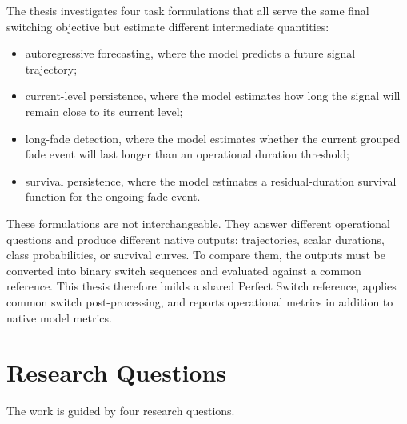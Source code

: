 The thesis investigates four task formulations that all serve the same final
switching objective but estimate different intermediate quantities:

\begin{itemize}
  \item autoregressive forecasting, where the model predicts a future signal
  trajectory;
  \item current-level persistence, where the model estimates how long the
  signal will remain close to its current level;
  \item long-fade detection, where the model estimates whether the current
  grouped fade event will last longer than an operational duration threshold;
  \item survival persistence, where the model estimates a residual-duration
  survival function for the ongoing fade event.
\end{itemize}

These formulations are not interchangeable. They answer different operational
questions and produce different native outputs: trajectories, scalar
durations, class probabilities, or survival curves. To compare them, the
outputs must be converted into binary switch sequences and evaluated against a
common reference. This thesis therefore builds a shared Perfect Switch
reference, applies common switch post-processing, and reports operational
metrics in addition to native model metrics.

\section{Research Questions}
\label{sec:introduction-research-questions}

The work is guided by four research questions.

